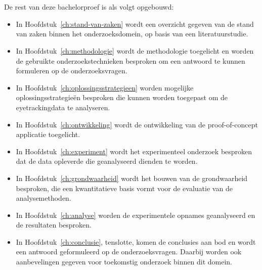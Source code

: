 \section{}%
\label{sec:opzet-bachelorproef}

De rest van deze bachelorproef is als volgt opgebouwd:
\begin{itemize}
  \item In Hoofdstuk~\ref{ch:stand-van-zaken} wordt een overzicht gegeven van de stand van zaken binnen het onderzoeksdomein, op basis van een literatuurstudie.
  \item In Hoofdstuk~\ref{ch:methodologie} wordt de methodologie toegelicht en worden de gebruikte onderzoekstechnieken besproken om een antwoord te kunnen formuleren op de onderzoeksvragen.
  \item In Hoofdstuk~\ref{ch:oplossingsstrategieen} worden mogelijke oplossingsstrategieën besproken die kunnen worden toegepast om de eyetrackingdata te analyseren.
  \item In Hoofdstuk~\ref{ch:ontwikkeling} wordt de ontwikkeling van de proof-of-concept applicatie toegelicht.
  \item In Hoofdstuk~\ref{ch:experiment} wordt het experimenteel onderzoek besproken dat de data opleverde die geanalyseerd dienden te worden.
  \item In Hoofdstuk~\ref{ch:grondwaarheid} wordt het bouwen van de grondwaarheid besproken, die een kwantitatieve basis vormt voor de evaluatie van de analysemethoden.
  \item In Hoofdstuk~\ref{ch:analyse} worden de experimentele opnames geanalyseerd en de resultaten besproken.
  \item In Hoofdstuk~\ref{ch:conclusie}, tenslotte, komen de conclusies aan bod en wordt een antwoord geformuleerd op de onderzoeksvragen. Daarbij worden ook aanbevelingen gegeven voor toekomstig onderzoek binnen dit domein.
\end{itemize}